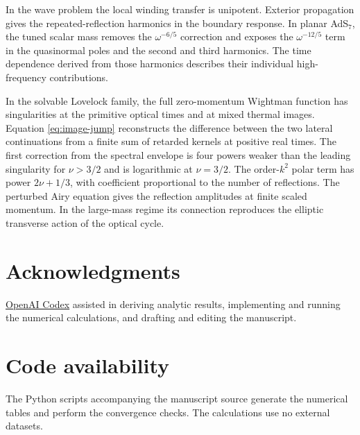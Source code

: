 \documentclass[11pt,a4paper]{article}
\begin{document}
In the wave problem the local winding transfer is unipotent. Exterior propagation gives the repeated-reflection harmonics in the boundary response. In planar AdS\(_7\), the tuned scalar mass removes the \(\omega^{-6/5}\) correction and exposes the \(\omega^{-12/5}\) term in the quasinormal poles and the second and third harmonics. The time dependence derived from those harmonics describes their individual high-frequency contributions.

In the solvable Lovelock family, the full zero-momentum Wightman function has singularities at the primitive optical times and at mixed thermal images. Equation \eqref{eq:image-jump} reconstructs the difference between the two lateral continuations from a finite sum of retarded kernels at positive real times. The first correction from the spectral envelope is four powers weaker than the leading singularity for \(\nu>3/2\) and is logarithmic at \(\nu=3/2\). The order-\(k^2\) polar term has power \(2\nu+1/3\), with coefficient proportional to the number of reflections. The perturbed Airy equation gives the reflection amplitudes at finite scaled momentum. In the large-mass regime its connection reproduces the elliptic transverse action of the optical cycle.

\section*{Acknowledgments}

\href{https://openai.com/codex/}{OpenAI Codex} assisted in deriving analytic results,
implementing and running the numerical calculations, and drafting and editing the
manuscript.

\section*{Code availability}

The Python scripts accompanying the manuscript source generate the numerical
tables and perform the convergence checks. The calculations use no external datasets.



\end{document}
